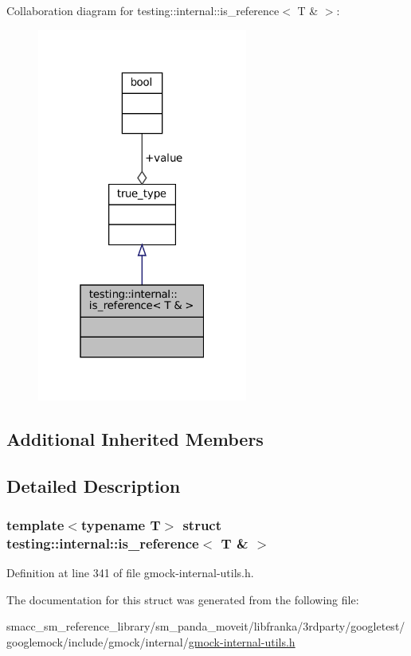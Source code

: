 Collaboration diagram for testing\+:\+:internal\+:\+:is\+\_\+reference$<$ T \& $>$\+:
\nopagebreak
\begin{figure}[H]
\begin{center}
\leavevmode
\includegraphics[width=196pt]{structtesting_1_1internal_1_1is__reference_3_01T_01_6_01_4__coll__graph}
\end{center}
\end{figure}
\subsection*{Additional Inherited Members}


\subsection{Detailed Description}
\subsubsection*{template$<$typename T$>$\newline
struct testing\+::internal\+::is\+\_\+reference$<$ T \& $>$}



Definition at line 341 of file gmock-\/internal-\/utils.\+h.



The documentation for this struct was generated from the following file\+:\begin{DoxyCompactItemize}
\item 
smacc\+\_\+sm\+\_\+reference\+\_\+library/sm\+\_\+panda\+\_\+moveit/libfranka/3rdparty/googletest/googlemock/include/gmock/internal/\hyperlink{gmock-internal-utils_8h}{gmock-\/internal-\/utils.\+h}\end{DoxyCompactItemize}
